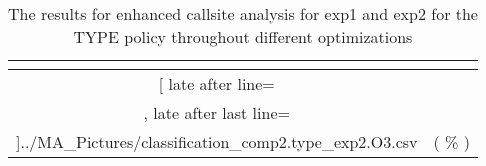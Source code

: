 \begin{table}[!htbp]
{\begin{tabular}{|c|c}
\multicolumn{1}{c}{}
	\\\midrule
	\csvreader[ late after line=\\, late after last line=\\\bottomrule]{../MA_Pictures/classification_comp2.type_exp2.O3.csv}{
}
	{\csvcoliv ( \csvcolv \% ) & \csvcolvi( \csvcolvii\% )}%


    	\end{tabular}
}
		\caption {The results for enhanced callsite analysis for exp1 and exp2 for the TYPE policy throughout different optimizations}
		\label{tbl:CSexp12TYPE}
\end{table}


